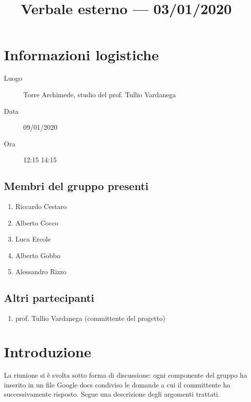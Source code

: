 \documentclass{article}
\title{Verbale esterno --- 03/01/2020}
\begin{document}


\section{Informazioni logistiche}%
\label{sec:informazioni_logistiche}

\begin{description}
  \item [Luogo] Torre Archimede, studio del prof. Tullio Vardanega
  \item [Data] 09/01/2020
  \item [Ora] 12:15  14:15
\end{description}

\subsection{Membri del gruppo presenti}%
\label{sub:membri_del_gruppo_presenti}

\begin{enumerate}
  \item Riccardo Cestaro
  \item Alberto Cocco
  \item Luca Ercole
  \item Alberto Gobbo
  \item Alessandro Rizzo
\end{enumerate}

\subsection{Altri partecipanti}%
\label{sub:altri_partecipanti}
\begin{enumerate}
  \item prof. Tullio Vardanega (committente del progetto)
\end{enumerate}


\section{Introduzione}%
\label{sec:introduzione}

La riunione si è svolta sotto forma di discussione: ogni componente del gruppo ha inserito in un file Google docs condiviso le domande a cui il committente ha successivamente risposto. Segue una descrizione degli argomenti trattati.
\end{document}
